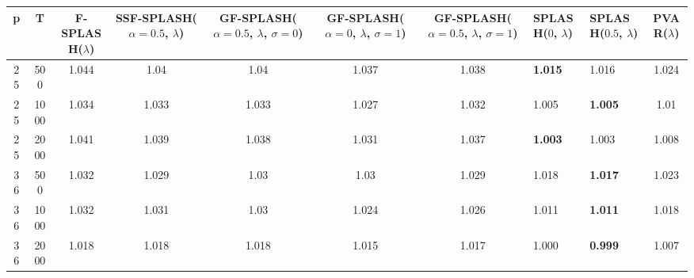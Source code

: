 \begin{tabular}{cccccccllc}
\hline
  p  &  T   &  F-SPLASH($\lambda$)  &  SSF-SPLASH($\alpha=0.5$, $\lambda$)  &  GF-SPLASH($\alpha=0.5$, $\lambda$, $\sigma=0$)  &  GF-SPLASH($\alpha=0$, $\lambda$, $\sigma=1$)  &  GF-SPLASH($\alpha=0.5$, $\lambda$, $\sigma=1$)  & SPLASH($0$, $\lambda$)   & SPLASH($0.5$, $\lambda$)   &  PVAR($\lambda$)  \\
\hline
 25  & 500  &         1.044         &                 1.04                  &                       1.04                       &                     1.037                      &                      1.038                       & \textbf{1.015}           & 1.016                      &       1.024       \\
 25  & 1000 &         1.034         &                 1.033                 &                      1.033                       &                     1.027                      &                      1.032                       & 1.005                    & \textbf{1.005}             &       1.01        \\
 25  & 2000 &         1.041         &                 1.039                 &                      1.038                       &                     1.031                      &                      1.037                       & \textbf{1.003}           & 1.003                      &       1.008       \\
 36  & 500  &         1.032         &                 1.029                 &                       1.03                       &                      1.03                      &                      1.029                       & 1.018                    & \textbf{1.017}             &       1.023       \\
 36  & 1000 &         1.032         &                 1.031                 &                       1.03                       &                     1.024                      &                      1.026                       & 1.011                    & \textbf{1.011}             &       1.018       \\
 36  & 2000 &         1.018         &                 1.018                 &                      1.018                       &                     1.015                      &                      1.017                       & 1.000                    & \textbf{0.999}             &       1.007       \\
\hline
\end{tabular}